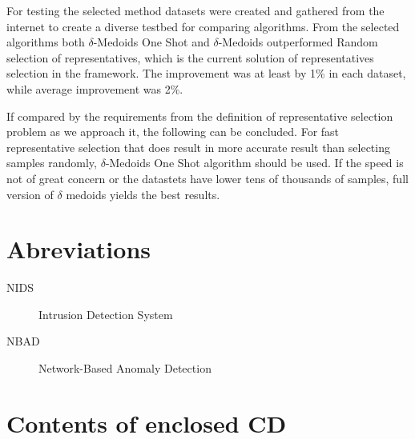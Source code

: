 \documentclass[thesis=B,english]{FITthesis}[2012/10/20]
\begin{document}
For testing the selected method datasets were created and gathered from the internet to create a diverse testbed for comparing algorithms.
From the selected algorithms both $\delta$-Medoids One Shot and $\delta$-Medoids outperformed Random selection of representatives, which is the current solution of representatives selection in the framework.
The improvement was at least by 1\% in each dataset, while average improvement was 2\%.  \\


If compared by the requirements from the definition of representative selection problem as we approach it, the following can be concluded.
For fast representative selection that does result in more accurate result than selecting samples randomly, $\delta$-Medoids One Shot algorithm should be used.
If the speed is not of great concern or the datastets have lower tens of thousands of samples, full version of $\delta$ medoids yields the best results.




\appendix

\chapter{Abreviations}
\begin{description}
	\item[NIDS] Intrusion Detection System
	\item[NBAD] Network-Based Anomaly Detection
\end{description}


\chapter{Contents of enclosed CD}


\begin{figure}
\end{figure}
\end{document}
